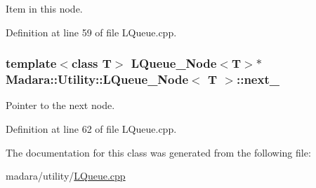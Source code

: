 Item in this node. 



Definition at line 59 of file LQueue.cpp.

\hypertarget{classMadara_1_1Utility_1_1LQueue__Node_a6ba29b70a8889befb70f4bdce165a77d}{
\subsubsection[{next\_\-}]{\setlength{\rightskip}{0pt plus 5cm}template$<$class T$>$ {\bf LQueue\_\-Node}$<$T$>$$\ast$ {\bf Madara::Utility::LQueue\_\-Node}$<$ T $>$::{\bf next\_\-}}}
\label{da/d3c/classMadara_1_1Utility_1_1LQueue__Node_a6ba29b70a8889befb70f4bdce165a77d}


Pointer to the next node. 



Definition at line 62 of file LQueue.cpp.



The documentation for this class was generated from the following file:\begin{DoxyCompactItemize}
\item 
madara/utility/\hyperlink{LQueue_8cpp}{LQueue.cpp}\end{DoxyCompactItemize}

